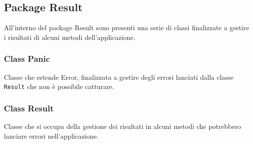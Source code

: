 \documentclass[a4paper, 12pt]{scrreprt}
\begin{document}
			\subsection{Package Result}
				All'interno del package Result sono presenti una serie di classi finalizzate a gestire i risultati di alcuni metodi dell'applicazione.
				
				\subsubsection{Class Panic}
				Classe che estende Error, finalizzata a gestire degli errori lanciati dalla classe \verb!Result! che non \`e possibile catturare.

				\subsubsection{Class Result}
				Classe che si occupa della gestione dei risultati in alcuni metodi che potrebbero lanciare errori nell'applicazione.\\
\end{document}

